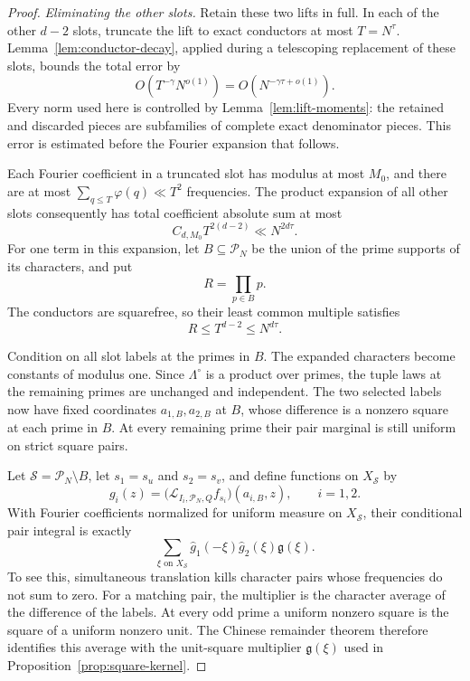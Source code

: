 \begin{proof}
\textit{Eliminating the other slots.}\quad
Retain these two lifts in full. In each of the other \(d-2\) slots,
truncate the lift to exact conductors at most \(T=N^\tau\).
Lemma~\ref{lem:conductor-decay}, applied during a telescoping replacement
of these slots, bounds the total error by
\begin{equation}
 O(T^{-\gamma}N^{o(1)})=O(N^{-\gamma\tau+o(1)}).
 \label{eq:interval-truncation-error}
\end{equation}
Every norm used here is controlled by Lemma~\ref{lem:lift-moments}:
the retained and discarded pieces are subfamilies of complete exact
denominator pieces. This error is estimated before the Fourier expansion
that follows.

Each Fourier coefficient in a truncated slot has modulus at most \(M_0\),
and there are at most \(\sum_{q\le T}\varphi(q)\ll T^2\) frequencies.
The product expansion of all other slots consequently has total
coefficient absolute sum at most
\begin{equation}
 C_{d,M_0}T^{2(d-2)}\ll N^{2d\tau}.
 \label{eq:interval-fourier-cost}
\end{equation}
For one term in this expansion, let \(B\subseteq\mathcal P_N\) be the
union of the prime supports of its characters, and put
\[
 R=\prod_{p\in B}p.
\]
The conductors are squarefree, so their least common multiple satisfies
\begin{equation}
 R\le T^{d-2}\le N^{d\tau}.
 \label{eq:interval-mode-modulus}
\end{equation}

Condition on all slot labels at the primes in \(B\). The expanded
characters become constants of modulus one. Since \(\Lambda^\circ\) is
a product over primes, the tuple laws at the remaining primes are
unchanged and independent. The two selected labels now have fixed
coordinates \(a_{1,B},a_{2,B}\) at \(B\), whose difference is a nonzero
square at each prime in \(B\). At every remaining prime their pair
marginal is still uniform on strict square pairs.

Let \(\mathcal S=\mathcal P_N\setminus B\), let \(s_1=s_u\) and
\(s_2=s_v\), and define functions on \(X_{\mathcal S}\) by
\[
 g_i(z)=\bigl(\mathcal L_{I_i,\mathcal P_N,Q}f_{s_i}\bigr)(a_{i,B},z),
 \qquad i=1,2.
\]
With Fourier coefficients normalized for uniform measure on
\(X_{\mathcal S}\), their conditional pair integral is exactly
\begin{equation}
 \sum_{\xi\text{ on }X_{\mathcal S}}
   \widehat g_1(-\xi)\widehat g_2(\xi)\mathfrak g(\xi).
 \label{eq:interval-pair-fourier}
\end{equation}
To see this, simultaneous translation kills character pairs whose
frequencies do not sum to zero. For a matching pair, the multiplier is
the character average of the difference of the labels. At every odd
prime a uniform nonzero square is the square of a uniform nonzero
unit. The Chinese remainder theorem therefore identifies this average
with the unit-square multiplier \(\mathfrak g(\xi)\) used in
Proposition~\ref{prop:square-kernel}.


\end{proof}
